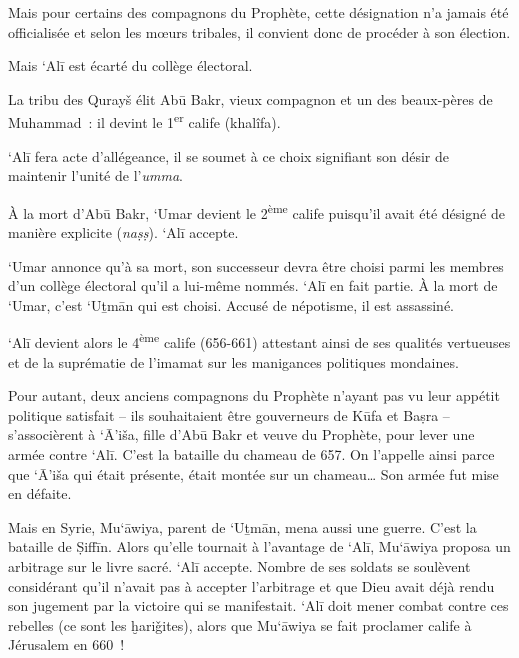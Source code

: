 


Mais pour certains des compagnons du Prophète, cette désignation n'a
jamais été officialisée et selon les mœurs tribales, il convient donc de
procéder à son élection.

Mais `Alī est écarté du collège électoral.

La tribu des Qurayš élit Abū Bakr, vieux compagnon et un des beaux-pères
de Muhammad~: il devint le 1\textsuperscript{er} calife (khalîfa).

`Alī fera acte d'allégeance, il se soumet à ce choix signifiant son
désir de maintenir l'unité de l'\emph{umma}.

À la mort d'Abū Bakr, `Umar devient le 2\textsuperscript{ème} calife
puisqu'il avait été désigné de manière explicite (\emph{naṣṣ}). `Alī
accepte.

`Umar annonce qu'à sa mort, son successeur devra être choisi parmi les
membres d'un collège électoral qu'il a lui-même nommés. `Alī en fait
partie. À la mort de `Umar, c'est `Uṯmān qui est choisi. Accusé de
népotisme, il est assassiné.

`Alī devient alors le 4\textsuperscript{ème} calife (656-661) attestant
ainsi de ses qualités vertueuses et de la suprématie de l'imamat sur les
manigances politiques mondaines.

Pour autant, deux anciens compagnons du Prophète n'ayant pas vu leur
appétit politique satisfait -- ils souhaitaient être gouverneurs de Kūfa
et Baṣra -- s'associèrent à `Ā'iša, fille d'Abū Bakr et veuve du
Prophète, pour lever une armée contre `Alī. C'est la bataille du chameau
de 657. On l'appelle ainsi parce que `Ā'iša qui était présente, était
montée sur un chameau\ldots{} Son armée fut mise en défaite.








Mais en Syrie, Mu`āwiya, parent de `Uṯmān, mena aussi une guerre. C'est
la bataille de Ṣiffīn. Alors qu'elle tournait à l'avantage de `Alī,
Mu`āwiya proposa un arbitrage sur le livre sacré. `Alī accepte. Nombre
de ses soldats se soulèvent considérant qu'il n'avait pas à accepter
l'arbitrage et que Dieu avait déjà rendu son jugement par la victoire
qui se manifestait. `Alī doit mener combat contre ces rebelles (ce sont
les ḫariǧites), alors que Mu`āwiya se fait proclamer calife à Jérusalem
en 660~!

